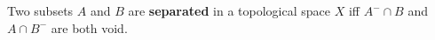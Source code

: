 Two subsets $A$ and $B$ are \textbf{separated} in a topological space $X$ iff $A^{-} \cap B$ and $A \cap B^{-}$ are both void.
